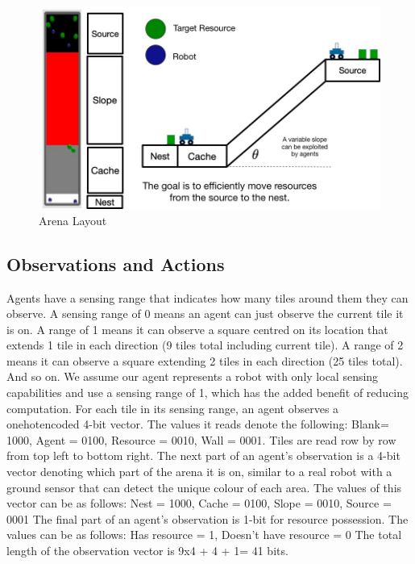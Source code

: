 \documentclass[12pt]{article}  %
\begin{document}
\begin{figure}
	\centering
	\includegraphics[width=\textwidth]{arena.jpg}
	\caption{Arena Layout}
	\label{fig:arena}
\end{figure}

\subsection{Observations and Actions}

Agents have a sensing range that indicates how many tiles around them they can observe. 
A sensing range of 0 means an agent can just observe the current tile it is on. 
A range of 1 means it can observe a square centred  on its location that extends 1 tile in each direction (9 tiles total including current tile). 
A range of 2 means it can observe a square extending 2 tiles in each direction (25 tiles total). 
And so on.
We assume our agent represents a robot with only local sensing capabilities and use a sensing range of 1, which has the added benefit of reducing computation.
For each tile in its sensing range, an agent observes a onehotencoded 4-bit vector. 
The values it reads denote the following: Blank= 1000, Agent = 0100, Resource = 0010, Wall = 0001.
Tiles are read row by row from top left to bottom right. 
The next part of an agent's observation is a 4-bit vector denoting which part of the arena it is on, similar to a real robot with a ground sensor that can detect the unique colour of each area.
The values of this vector can be as follows: Nest = 1000, Cache = 0100, Slope = 0010, Source = 0001
The final part of an agent's observation is 1-bit for resource possession. 
The values can be as follows: Has resource = 1, Doesn’t have resource = 0
The total length of the observation vector is 9x4 + 4 + 1= 41 bits.\\
\end{document}
